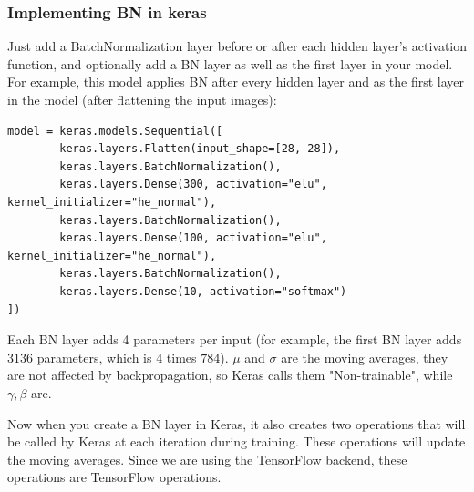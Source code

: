 \subsubsection{Implementing BN in keras}
Just add a BatchNormalization layer before or after each hidden layer's activation function, and optionally add a BN layer as well as the first layer in your model. For example, this model applies BN after every hidden layer and as the first layer in the model (after flattening the input images):
\begin{lstlisting}
model = keras.models.Sequential([
        keras.layers.Flatten(input_shape=[28, 28]),
        keras.layers.BatchNormalization(),
        keras.layers.Dense(300, activation="elu", kernel_initializer="he_normal"),
        keras.layers.BatchNormalization(),
        keras.layers.Dense(100, activation="elu", kernel_initializer="he_normal"),
        keras.layers.BatchNormalization(),
        keras.layers.Dense(10, activation="softmax")
])
\end{lstlisting}
Each BN layer adds 4 parameters per input (for example, the first BN layer adds $3136$ parameters, which is 4 times $784$). $\mu$ and $\sigma$ are the moving averages, they are not affected by backpropagation, so Keras calls them "Non-trainable", while $\gamma, \beta$ are.

Now when you create a BN layer in Keras, it also creates two operations that will be called by Keras at each iteration during training. These operations will update the moving averages. Since we are using the TensorFlow backend, these operations are TensorFlow operations.

